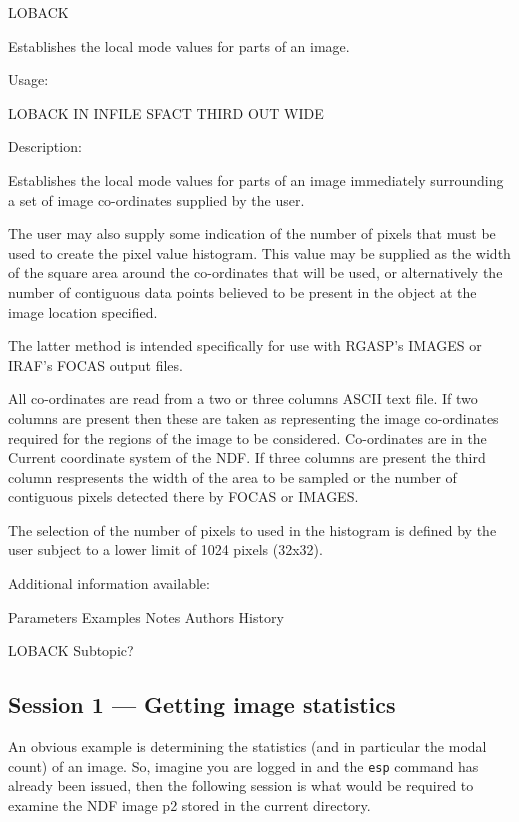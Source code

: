 \documentclass[twoside,11pt]{starlink}
\begin{document}
\begin{small}
\begin{terminalv}
 LOBACK

   Establishes the local mode values for parts of an image.

   Usage:

      LOBACK IN INFILE SFACT THIRD OUT WIDE

   Description:

      Establishes the local mode values for parts of an image
      immediately surrounding a set of image co-ordinates supplied by
      the user.

      The user may also supply some indication of the number of pixels
      that must be used to create the pixel value histogram. This
      value may be supplied as the width of the square area around the
      co-ordinates that will be used, or alternatively the number of
      contiguous data points believed to be present in the object at
      the image location specified.

      The latter method is intended specifically for use with RGASP's
      IMAGES or IRAF's FOCAS output files.

      All co-ordinates are read from a two or three columns
      ASCII text file. If two columns are present then these are
      taken as representing the image co-ordinates required for the
      regions of the image to be considered.  Co-ordinates are in
      the Current coordinate system of the NDF. If three columns are
      present the third column respresents the width of the area
      to be sampled or the number of contiguous pixels detected there
      by FOCAS or IMAGES.

      The selection of the number of pixels to used in the histogram is
      defined by the user subject to a lower limit of 1024 pixels
      (32x32).

   Additional information available:

   Parameters            Examples   Notes      Authors    History

 LOBACK Subtopic?
\end{terminalv}
\end{small}


\subsection{Session 1 --- Getting image statistics}

An obvious example is determining the statistics (and in particular the
modal count)  of an image. So, imagine you are logged in and the
\texttt{esp} command has already been issued, then the following session is
what would be required to examine the NDF image p2 stored in the
current directory.
\end{document}
